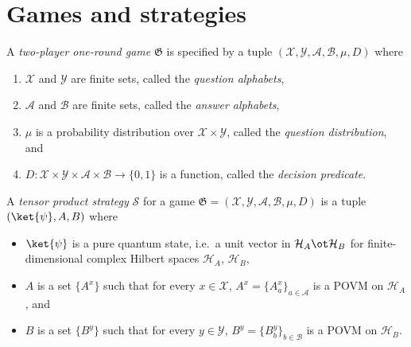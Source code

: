 \section{Games and strategies}
\label{sec:strat}

\begin{definition}\label{def:game}
	A \emph{two-player one-round game} $\mathfrak G$ is specified by a tuple $(\mathcal X, \mathcal Y, \mathcal A, \mathcal B, \mu, D)$ where
	\begin{enumerate}
		\item $\mathcal X$ and $\mathcal Y$ are finite sets, called the \emph{question alphabets},
		\item $\mathcal A$ and $\mathcal B$ are finite sets, called the \emph{answer alphabets},
		\item $\mu$ is a probability distribution over $\mathcal X \times \mathcal Y$, called the \emph{question distribution}, and
		\item $D \colon \mathcal X \times \mathcal Y \times \mathcal A \times \mathcal B \to \{0,1\}$ is a function, called the \emph{decision predicate}.
	\end{enumerate}
\end{definition}

\begin{definition}\label{def:tensor-product-strategy}
	A \emph{tensor product strategy} $\mathcal S$ for a game $\mathfrak G = (\mathcal X, \mathcal Y, \mathcal A, \mathcal B, \mu, D)$ is a tuple $(\ket{\psi}, A, B)$ where
	\begin{itemize}
		\item $\ket{\psi}$ is a pure quantum state, i.e.\ a unit vector in $\mathcal H_A \ot \mathcal H_B$ for finite-dimensional complex Hilbert spaces $\mathcal H_A$, $\mathcal H_B$,
		\item $A$ is a set $\{A^x\}$ such that for every $x \in \mathcal X$, $A^x = \{A^x_a\}_{a \in \mathcal A}$ is a POVM on $\mathcal H_A$, and
		\item $B$ is a set $\{B^y\}$ such that for every $y \in \mathcal Y$, $B^y = \{B^y_b\}_{b \in \mathcal B}$ is a POVM on $\mathcal H_B$.
	\end{itemize}
\end{definition}

